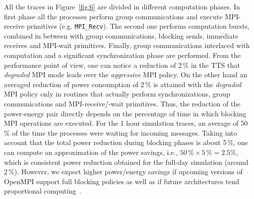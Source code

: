 All  the  traces  in   Figure~\ref{fig:6}  are  divided  in  different
computation  phases. In first  phase all  the processes  perform group
communications      and       execute      MPI-receive      primitives
(e.g. \texttt{MPI\_Recv}). The second one performs computation bursts,
combined  in  between   with  group  communications,  blocking  sends,
immediate  receives and  MPI-wait primitives.  Finally,
group  communications interlaced  with computation  and  a significant
synchronization  phase are  performed. From  the performance  point of
view, one can notice a reduction of 2\,\% in the TTS that \emph{degraded}  MPI
mode leads over the \emph{aggressive} MPI  policy. On the other hand an averaged
reduction of power consumption of  2\,\% is attained with the \emph{degraded} 
MPI policy  only in  routines that actually  perform synchronizations,
group  communications  and  MPI-receive/-wait primitives.   Thus,  the
reduction of the power-energy  pair directly depends on the percentage
of time in which blocking MPI  operations are executed. For the 1 hour
simulation traces, an average of 50\,\% of the time the processes were
waiting for incoming messages.  Taking  into account that  the total power  reduction during
blocking phases  is about 5\,\%,  one can compute an  approximation of
the  power savings,  i.e., $50\,\%  \times  5\,\% =  2.5\%$, which  is
consistent  power  reduction  obtained  for  the  full-day  simulation
(around  2\,\%). However,  we  expect higher  power/energy savings  if
upcoming versions of OpenMPI support full blocking policies as well as if 
future architectures tend proportional computing~\citep{Barroso-2007}.



